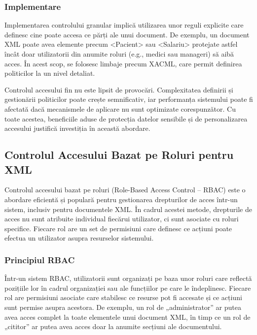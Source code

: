 \documentclass[runningheads]{llncs}
\begin{document}
\begin{spacing}{1.5}
\begin{itemize}
\end{itemize}

\subsubsection{Implementare}

Implementarea controlului granular implică utilizarea unor reguli explicite care definesc cine poate accesa ce părți ale unui document. De exemplu, un document XML poate avea elemente precum <Pacient> sau <Salariu> protejate astfel încât doar utilizatorii din anumite roluri (e.g., medici sau manageri) să aibă acces. În acest scop, se folosesc limbaje precum XACML, care permit definirea politicilor la un nivel detaliat.

Controlul accesului fin nu este lipsit de provocări. Complexitatea definirii și gestionării politicilor poate crește semnificativ, iar performanța sistemului poate fi afectată dacă mecanismele de aplicare nu sunt optimizate corespunzător. Cu toate acestea, beneficiile aduse de protecția datelor sensibile și de personalizarea accesului justifică investiția în această abordare.



\subsection{Controlul Accesului Bazat pe Roluri pentru XML}

Controlul accesului bazat pe roluri (Role-Based Access Control – RBAC) este o abordare eficientă și populară pentru gestionarea drepturilor de acces într-un sistem, inclusiv pentru documentele XML. În cadrul acestei metode, drepturile de acces nu sunt atribuite individual fiecărui utilizator, ci sunt asociate cu roluri specifice. Fiecare rol are un set de permisiuni care definesc ce acțiuni poate efectua un utilizator asupra resurselor sistemului.

\subsubsection{Principiul RBAC}

Într-un sistem RBAC, utilizatorii sunt organizați pe baza unor roluri care reflectă pozițiile lor în cadrul organizației sau ale funcțiilor pe care le îndeplinesc. Fiecare rol are permisiuni asociate care stabilesc ce resurse pot fi accesate și ce acțiuni sunt permise asupra acestora. De exemplu, un rol de „administrator” ar putea avea acces complet la toate elementele unui document XML, în timp ce un rol de „cititor” ar putea avea acces doar la anumite secțiuni ale documentului.


\end{spacing}
\end{document}

